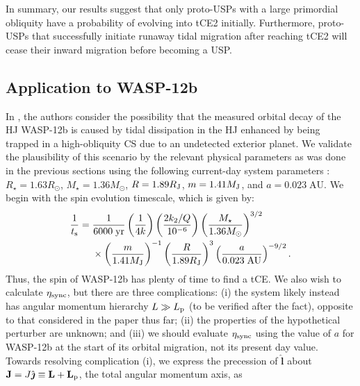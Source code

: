 \documentclass[
        fleqn,
        usenatbib,
        referee,
    ]{mnras}
\newcommand*{\p}[1]{\left(#1\right)}
\newcommand*{\bm}[1]{\mathbf{#1}}
\newcommand*{\uv}[1]{\hat{\boldsymbol{\mathbf{#1}}}}
\begin{document}
In summary, our results suggest that only proto-USPs with a large primordial
obliquity have a probability of evolving into tCE2 initially. Furthermore,
proto-USPs that successfully initiate runaway tidal migration after reaching
tCE2 will cease their inward migration before becoming a USP\@.

\subsection{Application to WASP-12b}\label{ss:disc_wasp12b}

In \citet{millholland2019obliquity}, the authors consider the possibility that
the measured orbital decay of the HJ WASP-12b \citep[$P / \dot{P} = -3.2
\;\mathrm{Myr}$; ][]{maciejewski2016departure, patra2017apparently} is caused by
tidal dissipation in the HJ enhanced by being trapped in a high-obliquity CS due
to an undetected exterior planet. We validate the plausibility of this scenario
by the relevant physical parameters as was done in the previous sections using
the following current-day system parameters \citet{hebb2009wasp,
maciejewski2013multi, millholland_wasp12b}: $R_\star = 1.63R_{\odot}$, $M_\star
= 1.36M_{\odot}$, $R = 1.89R_{\rm J}$, $m = 1.41M_{\rm J}$, and $a = 0.023
\;\mathrm{AU}$. We begin with the spin evolution timescale, which is given by:
\begin{align}
    \frac{1}{t_{\rm s}} ={}& \frac{1}{6000\;\mathrm{yr}}
            \p{\frac{1}{4k}}
            \p{\frac{2k_2/Q}{10^{-6}}}
            \p{\frac{M_\star}{1.36 M_{\odot}}}^{3/2}\nonumber\\
        &\times \p{\frac{m}{1.41 M_{\rm J}}}^{-1}
            \p{\frac{R}{1.89 R_{\rm J}}}^{3}
            \p{\frac{a}{0.023\;\mathrm{AU}}}^{-9/2}.
\end{align}
Thus, the spin of WASP-12b has plenty of time to find a tCE\@. We also wish to
calculate $\eta_{\rm sync}$, but there are three complications: (i) the system
likely instead has angular momentum hierarchy $L \gg L_{\rm p}$ (to be verified
after the fact), opposite to that considered in the paper thus far; (ii) the
properties of the hypothetical perturber are unknown; and (iii) we should
evaluate $\eta_{\rm sync}$ using the value of $a$ for WASP-12b at the start of
its orbital migration, not its present day value. Towards resolving complication
(i), we express the precession of $\uv{l}$ about $\bm{J} = J\uv{\jmath} \equiv
\bm{L} + \bm{L}_{\rm p}$, the total angular momentum axis, as
\end{document}
